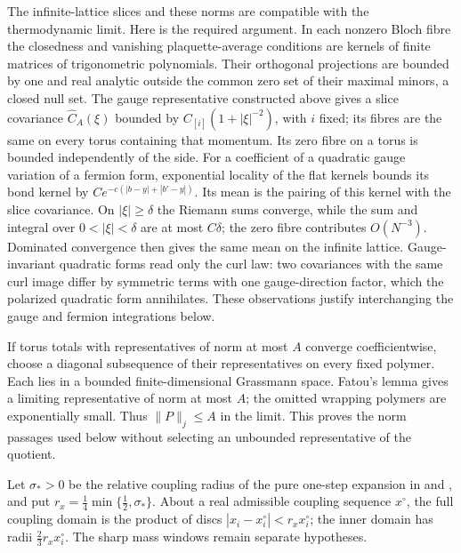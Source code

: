 \documentclass[11pt,letterpaper,reqno]{amsart}
\theoremstyle{definition}
\theoremstyle{remark}
\begin{document}
The infinite-lattice slices and these norms are compatible
with the thermodynamic limit.  Here is the required argument.
In each nonzero Bloch fibre the closedness and vanishing
plaquette-average conditions are kernels of finite matrices
of trigonometric polynomials.  Their orthogonal projections
are bounded by one and real analytic outside the common zero
set of their maximal minors, a closed null set.  The gauge
representative constructed above gives a slice covariance
$\widehat C_A(\xi)$ bounded by
$C_{[i]}(1+|\xi|^{-2})$, with $i$ fixed; its fibres are the
same on every torus containing that momentum.  Its zero
fibre on a torus is bounded independently of the side.
For a coefficient of a quadratic gauge variation of a fermion
form, exponential locality of the flat kernels bounds its
bond kernel by $Ce^{-c(|b-y|+|b'-y|)}$.  Its mean is the
pairing of this kernel with the slice covariance.  On
$|\xi|\ge\delta$ the Riemann sums converge, while the sum
and integral over $0<|\xi|<\delta$ are at most $C\delta$;
the zero fibre contributes $O(N^{-3})$.  Dominated convergence
then gives the same mean on the infinite lattice.
Gauge-invariant quadratic forms read only the curl law:
two covariances with the same curl image differ by symmetric
terms with one gauge-direction factor, which the polarized
quadratic form annihilates.  These observations justify
interchanging the gauge and fermion integrations below.

If torus totals with representatives of norm at most $A$
converge coefficientwise, choose a diagonal subsequence of
their representatives on every fixed polymer.  Each lies
in a bounded finite-dimensional Grassmann space.  Fatou's
lemma gives a limiting representative of norm at most $A$;
the omitted wrapping polymers are exponentially small.
Thus $\|P\|_j\le A$ in the limit.  This proves the norm
passages used below without selecting an unbounded
representative of the quotient.

Let $\sigma_*>0$ be the relative coupling radius of the pure
one-step expansion in \cite[eq.~4.cclvii]{YMM1} and \cite[Prop.~4.54]{YMM1},
and put $r_x=\tfrac14\min\{\tfrac12,\sigma_*\}$.
About a real admissible coupling sequence $x^\circ$, the full
coupling domain is the product of discs
$|x_i-x_i^\circ|<r_xx_i^\circ$; the inner domain has radii
$\tfrac23r_xx_i^\circ$. The sharp mass windows remain separate
hypotheses.
\end{document}
